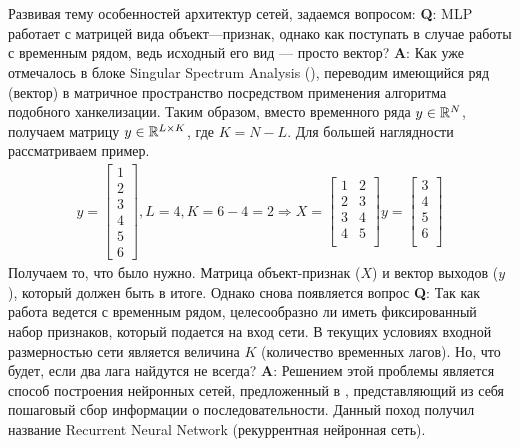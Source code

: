 \\\\
\indent Развивая тему особенностей архитектур сетей, задаемся вопросом: \textbf{Q}: MLP работает с матрицей вида объект---признак, однако как поступать в случае работы с временным рядом, ведь исходный его вид --- просто вектор? \textbf{A}: Как уже отмечалось в блоке Singular Spectrum Analysis (), переводим имеющийся ряд (вектор) в матричное пространство посредством применения алгоритма подобного ханкелизации. Таким образом, вместо временного ряда $y \in \mathbb{R}^{N}$, получаем матрицу $y \in \mathbb{R}^{L \times K}$, где $K  = N - L$. Для большей наглядности рассматриваем пример.
\begin{equation}
	\begin{split}
		y = \left[\begin{matrix}
			1\\2\\3\\4\\5\\6
		\end{matrix}\right], L = 4, K = 6 - 4 = 2 \Rightarrow
		X = \left[\begin{matrix}
			1 & 2\\
			2 & 3\\
			3 & 4\\
			4 & 5\\
		\end{matrix}\right]
		y = \left[\begin{matrix}
			3\\
			4\\
			5\\
			6\\
		\end{matrix}\right]
	\end{split}	
\end{equation}
Получаем то, что было нужно. Матрица объект-признак ($X$) и вектор выходов ($y$), который должен быть в итоге. Однако снова появляется вопрос \textbf{Q}: Так как работа ведется с временным рядом, целесообразно ли иметь фиксированный набор признаков, который подается на вход сети. В текущих условиях входной размерностью сети является величина $K$ (количество временных лагов). Но, что будет, если два лага найдутся не всегда? \textbf{A}: Решением этой проблемы является способ построения нейронных сетей, предложенный в \cite{hochreiter1997long, rumelhart1986learning}, представляющий из себя пошаговый сбор информации о последовательности. Данный поход получил название Recurrent Neural Network (рекуррентная нейронная сеть).

